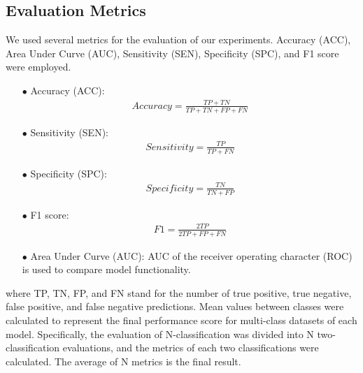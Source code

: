 \documentclass[journal]{IEEEtran}
\begin{document}
\subsection{Evaluation Metrics}
We used several metrics for the evaluation of our experiments. Accuracy (ACC), Area Under Curve (AUC), Sensitivity (SEN), Specificity (SPC), and F1 score were employed. 
\begin{itemize}

\item[$\bullet$]Accuracy (ACC):
\begin{equation}
\begin{aligned}
Accuracy = \frac{TP+TN}{TP+TN+FP+FN}
\end{aligned}
\label{f7}
\end{equation}

\item[$\bullet$] Sensitivity (SEN):
\begin{equation}
\begin{aligned}
Sensitivity = \frac{TP}{TP+FN}
\end{aligned}
\label{f8}
\end{equation}

\item[$\bullet$] Specificity (SPC):
\begin{equation}
\begin{aligned}
Specificity = \frac{TN}{TN+FP}
\end{aligned}
\label{f9}
\end{equation}

\item[$\bullet$] F1 score:
\begin{equation}
\begin{aligned}
F1 = \frac{2TP}{2TP+FP+FN}
\end{aligned}
\label{f10}
\end{equation}

\item[$\bullet$] Area Under Curve (AUC):
AUC of the receiver operating character (ROC) is used to compare model functionality.
\end{itemize}
where TP, TN, FP, and FN stand for the number of true positive, true negative, false positive, and false negative predictions. Mean values between classes were calculated to represent the final performance score for multi-class datasets of each model. Specifically, the evaluation of N-classification was divided into N two-classification evaluations, and the metrics of each two classifications were calculated. The average of N metrics is the final result.
\end{document}
